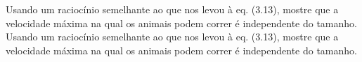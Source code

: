 Usando um raciocínio semelhante ao que nos levou à eq. (3.13), mostre que a velocidade máxima na qual os animais podem correr é independente do tamanho.
Usando um raciocínio semelhante ao que nos levou à eq. (3.13), mostre que a velocidade máxima na qual os animais podem correr é independente do tamanho.

